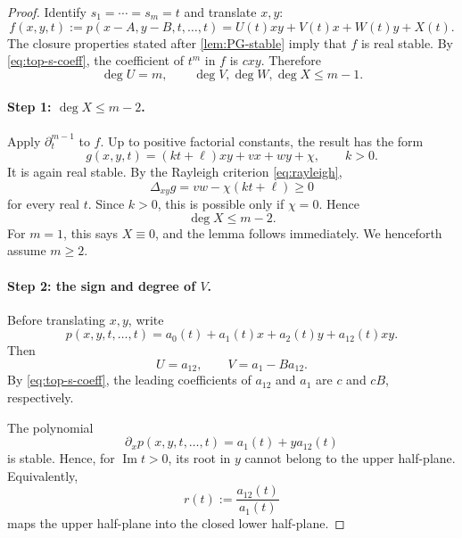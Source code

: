 \documentclass[11pt]{article}
\theoremstyle{definition}
\theoremstyle{remark}
\newcommand{\1}{\mathbf 1}
\begin{document}
\begin{proof}
Identify $s_1=\cdots=s_m=t$ and translate $x,y$:
\begin{equation}\label{eq:f-UVWX}
 f(x,y,t):=p(x-A,y-B,t,\dots,t)
 =U(t)xy+V(t)x+W(t)y+X(t).
\end{equation}
The closure properties stated after \cref{lem:PG-stable} imply that $f$ is real
stable.  By \eqref{eq:top-s-coeff}, the coefficient of $t^m$ in $f$ is $cxy$.
Therefore
\begin{equation}\label{eq:degree-UVWX}
 \deg U=m,\qquad \deg V,\deg W,\deg X\le m-1.
\end{equation}

\paragraph{Step 1: $\deg X\le m-2$.}
Apply $\partial_t^{m-1}$ to $f$.  Up to positive factorial constants, the result has
the form
\begin{equation}
 g(x,y,t)=(kt+\ell)xy+vx+wy+\chi,
 \qquad k>0.
\end{equation}
It is again real stable.  By the Rayleigh criterion \eqref{eq:rayleigh},
\begin{equation}
 \Delta_{xy}g=vw-\chi(kt+\ell)\ge0
\end{equation}
for every real $t$.  Since $k>0$, this is possible only if $\chi=0$.  Hence
\begin{equation}\label{eq:X-degree}
 \deg X\le m-2.
\end{equation}
For $m=1$, this says $X\equiv0$, and the lemma follows immediately.  We henceforth
assume $m\ge2$.

\paragraph{Step 2: the sign and degree of $V$.}
Before translating $x,y$, write
\begin{equation}\label{eq:a-decomp}
 p(x,y,t,\dots,t)=a_0(t)+a_1(t)x+a_2(t)y+a_{12}(t)xy.
\end{equation}
Then
\begin{equation}
 U=a_{12},\qquad V=a_1-Ba_{12}.
\end{equation}
By \eqref{eq:top-s-coeff}, the leading coefficients of $a_{12}$ and $a_1$ are
$c$ and $cB$, respectively.

The polynomial
\begin{equation}
 \partial_xp(x,y,t,\dots,t)=a_1(t)+y a_{12}(t)
\end{equation}
is stable.  Hence, for $\operatorname{Im}t>0$, its root in $y$ cannot belong to the
upper half-plane.  Equivalently,
\begin{equation}\label{eq:r-pick}
 r(t):=\frac{a_{12}(t)}{a_1(t)}
\end{equation}
maps the upper half-plane into the closed lower half-plane.


\end{proof}
\end{document}
